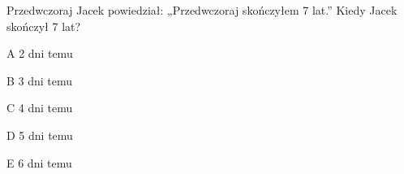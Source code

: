 \begin{tresc}
Przedwczoraj Jacek powiedział: „Przedwczoraj skończyłem 7 lat.” Kiedy Jacek skończył 7 lat?
\end{tresc}
\begin{wariant}{A} 2 dni temu \end{wariant}
\begin{wariant}{B} 3 dni temu \end{wariant}
\begin{wariant}{C} 4 dni temu \end{wariant}
\begin{wariant}{D} 5 dni temu \end{wariant}
\begin{wariant}{E} 6 dni temu \end{wariant}
